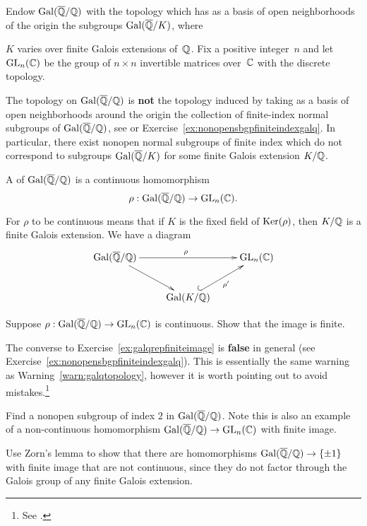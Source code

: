 Endow $\operatorname{Gal}(\overline{\mathbb{Q}}/\mathbb{Q})$ with the topology which has as a basis of open neighborhoods
of the origin the subgroups $\operatorname{Gal}(\overline{\mathbb{Q}}/K)$, where~{$K$ varies
over finite Galois extensions of~$\mathbb{Q}$.
Fix a positive integer~$n$ and let $\operatorname{GL}_n(\mathbb{C})$ be the group of
$n\times n$ invertible matrices over~$\mathbb{C}$ with the discrete topology.

\begin{warning}\label{warn:galqtopology}
	The topology on $\operatorname{Gal}(\overline{\mathbb{Q}}/\mathbb{Q})$ is {\bf not} the topology induced
	by taking as a basis of open neighborhoods around the origin
	the collection of finite-index normal subgroups of $\operatorname{Gal}(\overline{\mathbb{Q}}/\mathbb{Q})$,
	see \cite[Ch.~7]{milne:FT} or
	Exercise~\ref{ex:nonopensbgpfiniteindexgalq}. In particular,
	there exist nonopen normal subgroups of finite index which
	do not correspond to subgroups $\operatorname{Gal}(\overline{\mathbb{Q}}/K)$ for some
	finite Galois extension $K/\mathbb{Q}$.
\end{warning}

\begin{definition}
A  of $\operatorname{Gal}(\overline{\mathbb{Q}}/\mathbb{Q})$
is a continuous homomorphism
$$
  \rho:\operatorname{Gal}(\overline{\mathbb{Q}}/\mathbb{Q})\to \operatorname{GL}_n(\mathbb{C}).
$$
\end{definition}
For $\rho$ to be continuous means that if $K$ is the fixed
field of $\operatorname{Ker}(\rho)$, then $K/\mathbb{Q}$ is a finite Galois extension.  We have
a diagram
$$\xymatrix{ {\galq}\ar[rr]^{\rho}\ar[dr]& &{\GL_n(\C)}\\
&{\Gal(K/\Q)}\ar@{^{(}->}[ur]_{\rho'}}
$$

\begin{exercise}\label{ex:galqrepfiniteimage}
	Suppose $\rho:\operatorname{Gal}(\overline{\mathbb{Q}}/\mathbb{Q})\to\operatorname{GL}_n(\mathbb{C})$ is continuous.
	Show that the image is finite.
\end{exercise}

\begin{remark}
	The converse to Exercise~\ref{ex:galqrepfiniteimage}
	is \textbf{false} in general (see
	Exercise~\ref{ex:nonopensbgpfiniteindexgalq}).
	This is essentially the same warning as
	Warning~\ref{warn:galqtopology}, however it is worth
	pointing out to avoid mistakes.\footnote{
	See \cite[Pg.~1]{artinconjectureLectureNotes}.}
\end{remark}

\begin{exercise}\label{ex:nonopensbgpfiniteindexgalq}
	Find a nonopen subgroup of index $2$ in $\operatorname{Gal}(\overline{\mathbb{Q}}/\mathbb{Q})$.
	Note this is also an example of a non-continuous
	homomorphism $\operatorname{Gal}(\overline{\mathbb{Q}}/\mathbb{Q})\to\operatorname{GL}_n(\mathbb{C})$ with finite image.
	
	
	\begin{hint}
		Use Zorn's lemma to show that there are homomorphisms
		$\operatorname{Gal}(\overline{\mathbb{Q}}/\mathbb{Q})\to\{\pm 1\}$ with finite image that are not continuous,
		since they do not factor through the Galois group of any
		finite Galois extension.
	\end{hint}
	

\end{exercise}}
